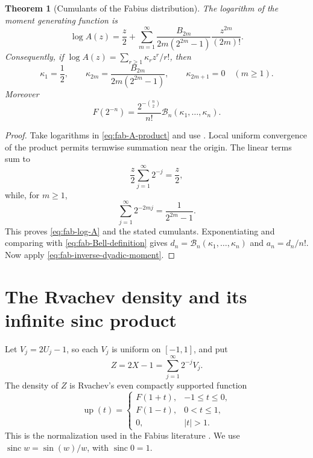 \documentclass[11pt,oneside,openany]{book}
\newtheorem{theorem}{Theorem}[chapter]
\theoremstyle{definition}
\theoremstyle{remark}
\newcommand{\abs}[1]{\lvert #1\rvert}
\newcommand{\sinc}{\operatorname{sinc}}
\begin{document}
\begin{theorem}[Cumulants of the Fabius distribution]
\label{thm:fab-cumulants}
The logarithm of the moment generating function is
\begin{equation}
 \log A(z)=\frac z2+
 \sum_{m=1}^{\infty}
 \frac{B_{2m}}{2m(2^{2m}-1)}\frac{z^{2m}}{(2m)!}.
 \label{eq:fab-log-A}
\end{equation}
Consequently, if
$\log A(z)=\sum_{r\ge1}\kappa_rz^r/r!$, then
\begin{equation}
 \kappa_1=\frac12,
 \qquad
 \kappa_{2m}=\frac{B_{2m}}{2m(2^{2m}-1)},
 \qquad
 \kappa_{2m+1}=0\quad(m\ge1).
 \label{eq:fab-cumulants}
\end{equation}
Moreover
\begin{equation}
 \boxed{
 F(2^{-n})=
 \frac{2^{-\binom n2}}{n!}
 \mathcal B_n(\kappa_1,\ldots,\kappa_n).}
 \label{eq:fab-Bell-values}
\end{equation}
\end{theorem}

\begin{proof}
Take logarithms in \eqref{eq:fab-A-product} and use
.  Local uniform convergence of the product permits
termwise summation near the origin.  The linear terms sum to
\[
 \frac z2\sum_{j=1}^{\infty}2^{-j}=\frac z2,
\]
while, for $m\ge1$,
\[
 \sum_{j=1}^{\infty}2^{-2mj}=\frac1{2^{2m}-1}.
\]
This proves \eqref{eq:fab-log-A} and the stated cumulants.  Exponentiating
and comparing with \eqref{eq:fab-Bell-definition} gives
$d_n=\mathcal B_n(\kappa_1,\ldots,\kappa_n)$ and
$a_n=d_n/n!$.  Now apply \eqref{eq:fab-inverse-dyadic-moment}.
\end{proof}

\section{The Rvachev density and its infinite sinc product}

Let $V_j=2U_j-1$, so each $V_j$ is uniform on $[-1,1]$, and put
\begin{equation}
 Z=2X-1=\sum_{j=1}^{\infty}2^{-j}V_j.
 \label{eq:fab-centered-random-series}
\end{equation}
The density of $Z$ is Rvachev's even compactly supported function
\begin{equation}
 \operatorname{up}(t)=
 \begin{cases}
 F(1+t),&-1\le t\le0,\\
 F(1-t),&0<t\le1,\\
 0,&\abs t>1.
 \end{cases}
 \label{eq:fab-up-density}
\end{equation}
This is the normalization used in the Fabius literature
\cite{Fabius1966,AriasDefinition2017,AriasArithmetic2017}.
We use $\sinc w=\sin(w)/w$, with $\sinc0=1$.
\end{document}
